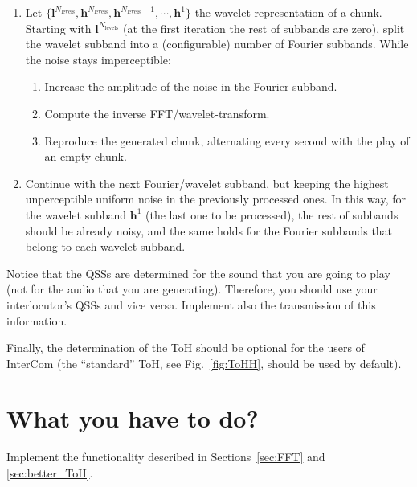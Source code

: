 \begin{enumerate}
\item Let
  $\{{\mathbf l}^{N_{\text{levels}}}, {\mathbf h}^{N_{\text{levels}}},
  {\mathbf h}^{N_{\text{levels}}-1},\cdots, {\mathbf h}^1\}$ the
  wavelet representation of a
  chunk. %
  Starting with ${\mathbf l}^{N_{\text{levels}}}$ (at the first
  iteration the rest of subbands are zero), split the wavelet subband
  into a (configurable) number of Fourier subbands. While the noise stays
  imperceptible:
  \begin{enumerate}
  \item Increase the amplitude of the noise in the Fourier subband.
  \item Compute the inverse FFT/wavelet-transform.
  \item Reproduce the generated chunk, alternating every second with
    the play of an empty chunk.
  \end{enumerate}
\item Continue with the next Fourier/wavelet subband, but keeping the
  highest unperceptible uniform noise in the previously processed
  ones. In this way, for the wavelet subband ${\mathbf h}^1$ (the last
  one to be processed), the rest of subbands should be already
  noisy, and the same holds for the Fourier subbands that
  belong to each wavelet subband.
\end{enumerate}

Notice that the QSSs are determined for the sound that you are going
to play (not for the audio that you are generating). Therefore, you
should use your interlocutor's QSSs and vice versa. Implement also the
transmission of this information.

Finally, the determination of the ToH should be optional for the users of
InterCom (the ``standard'' ToH, see Fig.~\ref{fig:ToHH}, should be
used by default).

\section{What you have to do?}

Implement the functionality described in Sections~\ref{sec:FFT} and
\ref{sec:better_ToH}.

